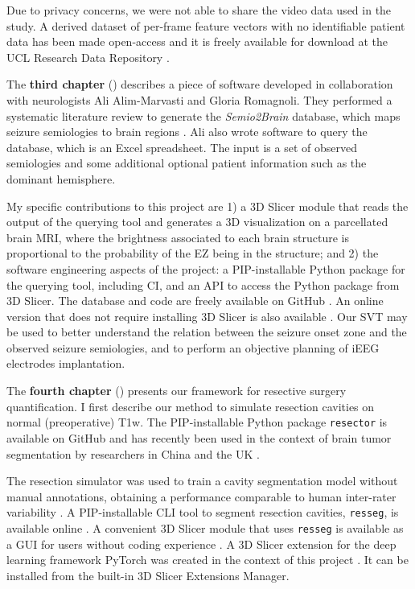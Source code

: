 Due to privacy concerns, we were not able to share the video data used in the study.
A derived dataset of per-frame feature vectors with no identifiable patient data has been made open-access and it is freely available for download at the UCL Research Data Repository \cite{perez-garcia_data_2021}.


The \textbf{third chapter} () describes a piece of software developed in collaboration with neurologists Ali Alim-Marvasti and Gloria Romagnoli.
They performed a systematic literature review to generate the \textit{Semio2Brain} database, which maps seizure semiologies to brain regions \cite{alim-marvasti_probabilistic_2021}.
Ali also wrote software to query the database, which is an Excel spreadsheet.
The input is a set of observed semiologies and some additional optional patient information such as the dominant hemisphere.

My specific contributions to this project are 1) a 3D Slicer module \cite{fedorov_3d_2012} that reads the output of the querying tool and generates a 3D visualization on a parcellated brain \ac{MRI}, where the brightness associated to each brain structure is proportional to the probability of the \ac{EZ} being in the structure; and 2) the software engineering aspects of the project: a \ac{PIP}-installable Python package for the querying tool, including \ac{CI}, and an \ac{API} to access the Python package from 3D Slicer.
The database and code are freely available on GitHub%
.
An online version that does not require installing 3D Slicer is also available%
.
Our \ac{SVT} may be used to better understand the relation between the seizure onset zone and the observed seizure semiologies, and to perform an objective planning of \ac{iEEG} electrodes implantation.


The \textbf{fourth chapter} () presents our framework for resective surgery quantification.
I first describe our method to simulate resection cavities on normal (preoperative) \ac{T1w}.
The \ac{PIP}-installable Python package \texttt{resector} is available on GitHub%
and has recently been used in the context of brain tumor segmentation by researchers in China and the UK \cite{zhang_self-supervised_2021}.

The resection simulator was used to train a cavity segmentation model without manual annotations, obtaining a performance comparable to human inter-rater variability \cite{perez-garcia_simulation_2020}.
A \ac{PIP}-installable \ac{CLI} tool to segment resection cavities, \texttt{resseg}, is available online%
.
A convenient 3D Slicer module that uses \texttt{resseg} is available as a \ac{GUI} for users without coding experience%
.
A 3D Slicer extension for the deep learning framework PyTorch was created in the context of this project%
.
It can be installed from the built-in 3D Slicer Extensions Manager.

